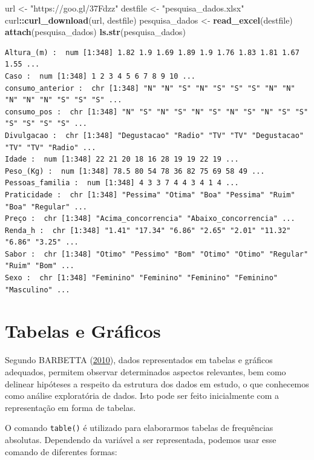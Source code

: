 \documentclass[12pt,brazil,]{book}
\newenvironment{Shaded}{\begin{snugshade}}{\end{snugshade}}
\newcommand{\KeywordTok}[1]{\textcolor[rgb]{0.13,0.29,0.53}{\textbf{#1}}}
\newcommand{\NormalTok}[1]{#1}
\newcommand{\OperatorTok}[1]{\textcolor[rgb]{0.81,0.36,0.00}{\textbf{#1}}}
\newcommand{\StringTok}[1]{\textcolor[rgb]{0.31,0.60,0.02}{#1}}
\begin{document}
\begin{Shaded}
\begin{Highlighting}[]
\NormalTok{url <-}\StringTok{ "https://goo.gl/37Fdzz"}
\NormalTok{destfile <-}\StringTok{ "pesquisa_dados.xlsx"}
\NormalTok{curl}\OperatorTok{::}\KeywordTok{curl_download}\NormalTok{(url, destfile)}
\NormalTok{pesquisa_dados <-}\StringTok{ }\KeywordTok{read_excel}\NormalTok{(destfile)}
\KeywordTok{attach}\NormalTok{(pesquisa_dados)}
\KeywordTok{ls.str}\NormalTok{(pesquisa_dados)}
\end{Highlighting}
\end{Shaded}

\begin{verbatim}
Altura_(m) :  num [1:348] 1.82 1.9 1.69 1.89 1.9 1.76 1.83 1.81 1.67 1.55 ...
Caso :  num [1:348] 1 2 3 4 5 6 7 8 9 10 ...
consumo_anterior :  chr [1:348] "N" "N" "S" "N" "S" "S" "S" "N" "N" "N" "N" "N" "S" "S" "S" ...
consumo_pos :  chr [1:348] "N" "S" "N" "S" "N" "S" "N" "S" "N" "S" "S" "S" "S" "S" "S" ...
Divulgacao :  chr [1:348] "Degustacao" "Radio" "TV" "TV" "Degustacao" "TV" "TV" "Radio" ...
Idade :  num [1:348] 22 21 20 18 16 28 19 19 22 19 ...
Peso_(Kg) :  num [1:348] 78.5 80 54 78 36 82 75 69 58 49 ...
Pessoas_familia :  num [1:348] 4 3 3 7 4 4 3 4 1 4 ...
Praticidade :  chr [1:348] "Pessima" "Otima" "Boa" "Pessima" "Ruim" "Boa" "Regular" ...
Preço :  chr [1:348] "Acima_concorrencia" "Abaixo_concorrencia" ...
Renda_h :  chr [1:348] "1.41" "17.34" "6.86" "2.65" "2.01" "11.32" "6.86" "3.25" ...
Sabor :  chr [1:348] "Otimo" "Pessimo" "Bom" "Otimo" "Otimo" "Regular" "Ruim" "Bom" ...
Sexo :  chr [1:348] "Feminino" "Feminino" "Feminino" "Feminino" "Masculino" ...
\end{verbatim}

\hypertarget{tabelas-e-graficos}{%
\section{Tabelas e Gráficos}\label{tabelas-e-graficos}}

Segundo BARBETTA (\protect\hyperlink{ref-barbetta1988}{2010}), dados
representados em tabelas e gráficos adequados, permitem observar
determinados aspectos relevantes, bem como delinear hipóteses a respeito
da estrutura dos dados em estudo, o que conhecemos como análise
exploratória de dados. Isto pode ser feito inicialmente com a
representação em forma de tabelas.

O comando \texttt{table()} é utilizado para elaborarmos tabelas de
frequências absolutas. Dependendo da variável a ser representada,
podemos usar esse comando de diferentes formas:
\end{document}
